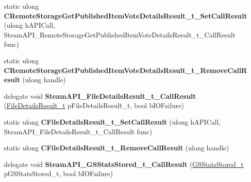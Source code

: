 \begin{DoxyCompactItemize}
static ulong {\bfseries C\+Remote\+Storage\+Get\+Published\+Item\+Vote\+Details\+Result\+\_\+t\+\_\+\+Set\+Call\+Result} (ulong h\+A\+P\+I\+Call, Steam\+A\+P\+I\+\_\+\+Remote\+Storage\+Get\+Published\+Item\+Vote\+Details\+Result\+\_\+t\+\_\+\+Call\+Result func)
\item 
\mbox{\label{class_valve_1_1_interop_1_1_native_entrypoints_a16b880f1aaa965139d34ae933d053d45}} 
static ulong {\bfseries C\+Remote\+Storage\+Get\+Published\+Item\+Vote\+Details\+Result\+\_\+t\+\_\+\+Remove\+Call\+Result} (ulong handle)
\item 
\mbox{\label{class_valve_1_1_interop_1_1_native_entrypoints_a25c6715cfbf4aa5d8de32580553d9a2d}} 
delegate void {\bfseries Steam\+A\+P\+I\+\_\+\+File\+Details\+Result\+\_\+t\+\_\+\+Call\+Result} (\hyperlink{struct_valve_1_1_steamworks_1_1_file_details_result__t}{File\+Details\+Result\+\_\+t} p\+File\+Details\+Result\+\_\+t, bool b\+I\+O\+Failure)
\item 
\mbox{\label{class_valve_1_1_interop_1_1_native_entrypoints_a84aacf0a87b1244f45567746e7524070}} 
static ulong {\bfseries C\+File\+Details\+Result\+\_\+t\+\_\+\+Set\+Call\+Result} (ulong h\+A\+P\+I\+Call, Steam\+A\+P\+I\+\_\+\+File\+Details\+Result\+\_\+t\+\_\+\+Call\+Result func)
\item 
\mbox{\label{class_valve_1_1_interop_1_1_native_entrypoints_a083be6ea5c9ea941e15691fdc9b2a9d8}} 
static ulong {\bfseries C\+File\+Details\+Result\+\_\+t\+\_\+\+Remove\+Call\+Result} (ulong handle)
\item 
\mbox{\label{class_valve_1_1_interop_1_1_native_entrypoints_ac7dabedc69f46965b6c6284afc99e379}} 
delegate void {\bfseries Steam\+A\+P\+I\+\_\+\+G\+S\+Stats\+Stored\+\_\+t\+\_\+\+Call\+Result} (\hyperlink{struct_valve_1_1_steamworks_1_1_g_s_stats_stored__t}{G\+S\+Stats\+Stored\+\_\+t} p\+G\+S\+Stats\+Stored\+\_\+t, bool b\+I\+O\+Failure)
\item 
\mbox{\label{class_valve_1_1_interop_1_1_native_entrypoints_ae06276acfbf578aafe4e9e21ed76997e}} 

\end{DoxyCompactItemize}
